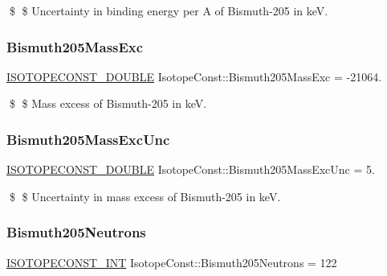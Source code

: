 \$ \$ Uncertainty in binding energy per A of Bismuth-\/205 in keV. \mbox{\label{group___isotope_const-_bismuth-_bi205_gae4e03fe5ef1e60b0f11299b6c7bd53bb}} 
\subsubsection{\texorpdfstring{Bismuth205\+Mass\+Exc}{Bismuth205MassExc}}
{\footnotesize\ttfamily \mbox{\hyperlink{group___isotope_const-_macros_ga8f45a7272ce02c0b4c65c44636ed719a}{I\+S\+O\+T\+O\+P\+E\+C\+O\+N\+S\+T\+\_\+\+D\+O\+U\+B\+LE}} Isotope\+Const\+::\+Bismuth205\+Mass\+Exc = -\/21064.}

\$ \$ Mass excess of Bismuth-\/205 in keV. \mbox{\label{group___isotope_const-_bismuth-_bi205_ga773093b465532451c3067da62d665611}} 
\subsubsection{\texorpdfstring{Bismuth205\+Mass\+Exc\+Unc}{Bismuth205MassExcUnc}}
{\footnotesize\ttfamily \mbox{\hyperlink{group___isotope_const-_macros_ga8f45a7272ce02c0b4c65c44636ed719a}{I\+S\+O\+T\+O\+P\+E\+C\+O\+N\+S\+T\+\_\+\+D\+O\+U\+B\+LE}} Isotope\+Const\+::\+Bismuth205\+Mass\+Exc\+Unc = 5.}

\$ \$ Uncertainty in mass excess of Bismuth-\/205 in keV. \mbox{\label{group___isotope_const-_bismuth-_bi205_gac03afb08090b24fc0d294fb1f601bd8d}} 
\subsubsection{\texorpdfstring{Bismuth205\+Neutrons}{Bismuth205Neutrons}}
{\footnotesize\ttfamily \mbox{\hyperlink{group___isotope_const-_macros_ga5f18360b3e99483a35c32d789e62621c}{I\+S\+O\+T\+O\+P\+E\+C\+O\+N\+S\+T\+\_\+\+I\+NT}} Isotope\+Const\+::\+Bismuth205\+Neutrons = 122}

